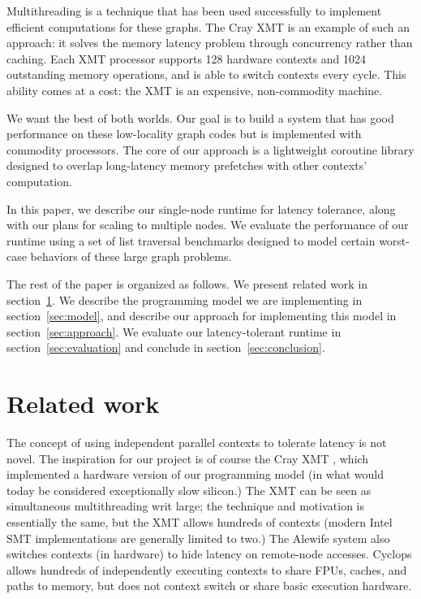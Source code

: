 \documentclass{acm_proc_article-sp}
\begin{document}
Multithreading is a technique that has been used successfully to
implement efficient computations for these graphs. The Cray XMT is an
example of such an approach: it solves the memory latency problem
through concurrency rather than caching. Each XMT processor supports
128 hardware contexts and 1024 outstanding memory operations, and is
able to switch contexts every cycle. This ability comes at a cost: the
XMT is an expensive, non-commodity machine.

We want the best of both worlds. Our goal is to build a system that
has good performance on these low-locality graph codes but is
implemented with commodity processors. The core of our approach is a
lightweight coroutine library designed to overlap long-latency memory
prefetches with other contexts' computation.

In this paper, we describe our single-node runtime for latency
tolerance, along with our plans for scaling to multiple nodes.  We
evaluate the performance of our runtime using a set of list traversal
benchmarks designed to model certain worst-case behaviors of these
large graph problems. 

The rest of the paper is organized as follows. We present related work
in section~\ref{sec:related}. We describe the programming model we are
implementing in section~\ref{sec:model}, and describe our approach for
implementing this model in section~\ref{sec:approach}. We evaluate our
latency-tolerant runtime in section~\ref{sec:evaluation} and conclude
in section~\ref{sec:conclusion}.

\section{Related work}
\label{sec:related}
The concept of using independent parallel contexts to tolerate latency
is not novel.  The inspiration for our project is of course the Cray
XMT \cite{feo-xmt}, which implemented a hardware version of our
programming model (in what would today be considered exceptionally
slow silicon.)  The XMT can be seen as simultaneous multithreading
\cite{tullsen-smt} writ large; the technique and motivation is
essentially the same, but the XMT allows hundreds of contexts (modern
Intel SMT implementations are generally limited to two.) The Alewife
system \cite{agarwal-alewife} also switches contexts (in hardware) to
hide latency on remote-node accesses.  Cyclops \cite{almasi-cyclops}
allows hundreds of independently executing contexts to share FPUs,
caches, and paths to memory, but does not context switch or share
basic execution hardware.  
\end{document}
